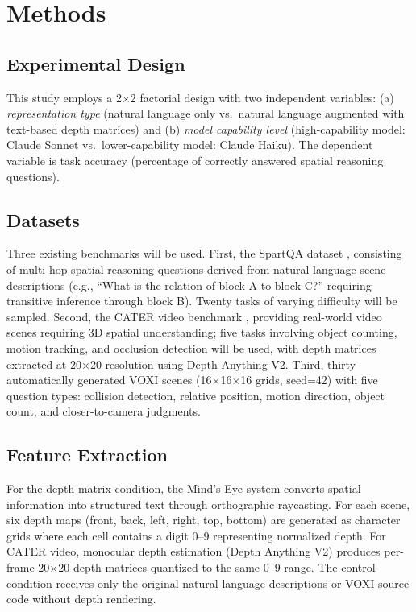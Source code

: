 \documentclass[12pt,a4paper]{article}
\begin{document}
\section*{Methods}

\subsection*{Experimental Design}

This study employs a 2$\times$2 factorial design with two independent variables: (a) \emph{representation type} (natural language only vs.\ natural language augmented with text-based depth matrices) and (b) \emph{model capability level} (high-capability model: Claude Sonnet vs.\ lower-capability model: Claude Haiku). The dependent variable is task accuracy (percentage of correctly answered spatial reasoning questions).

\subsection*{Datasets}

Three existing benchmarks will be used. First, the SpartQA dataset \cite{mirzaee2021}, consisting of multi-hop spatial reasoning questions derived from natural language scene descriptions (e.g., ``What is the relation of block A to block C?'' requiring transitive inference through block B). Twenty tasks of varying difficulty will be sampled. Second, the CATER video benchmark \cite{girdhar2020}, providing real-world video scenes requiring 3D spatial understanding; five tasks involving object counting, motion tracking, and occlusion detection will be used, with depth matrices extracted at 20$\times$20 resolution using Depth Anything V2. Third, thirty automatically generated VOXI scenes (16$\times$16$\times$16 grids, seed=42) with five question types: collision detection, relative position, motion direction, object count, and closer-to-camera judgments.

\subsection*{Feature Extraction}

For the depth-matrix condition, the Mind's Eye system converts spatial information into structured text through orthographic raycasting. For each scene, six depth maps (front, back, left, right, top, bottom) are generated as character grids where each cell contains a digit 0--9 representing normalized depth. For CATER video, monocular depth estimation (Depth Anything V2) produces per-frame 20$\times$20 depth matrices quantized to the same 0--9 range. The control condition receives only the original natural language descriptions or VOXI source code without depth rendering.
\end{document}
